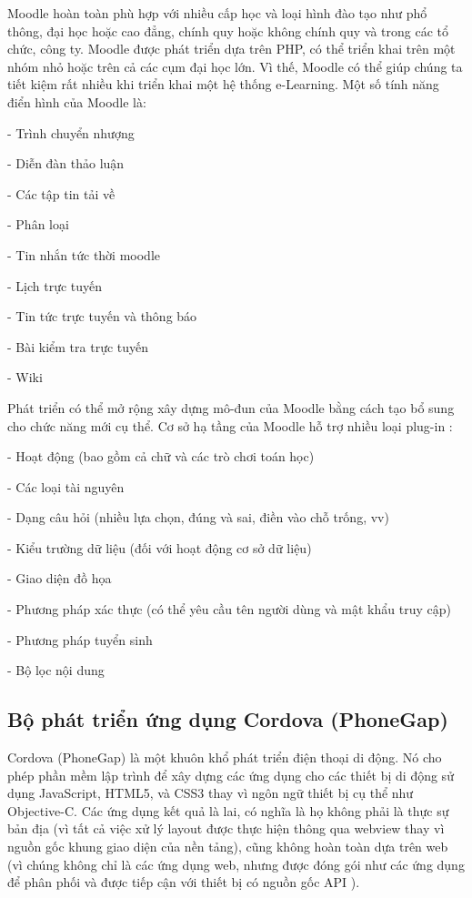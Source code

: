 Moodle hoàn toàn phù hợp với nhiều cấp học và loại hình đào tạo như phổ thông, đại học hoặc cao đẳng, chính quy hoặc không chính quy và trong các tổ chức, công ty.
Moodle được phát triển dựa trên PHP, có thể triển khai trên một nhóm nhỏ hoặc trên cả các cụm đại học lớn. Vì thế, Moodle có thể giúp chúng ta tiết kiệm rất nhiều khi triển khai một hệ thống e-Learning.
Một số tính năng điển hình của Moodle là:

\quad - Trình chuyển nhượng

\quad - Diễn đàn thảo luận

\quad - Các tập tin tải về

\quad - Phân loại

\quad - Tin nhắn tức thời moodle

\quad - Lịch trực tuyến

\quad - Tin tức trực tuyến và thông báo

\quad - Bài kiểm tra trực tuyến

\quad - Wiki

Phát triển có thể mở rộng xây dựng mô-đun của Moodle bằng cách tạo bổ sung cho chức năng mới cụ thể. Cơ sở hạ tầng của Moodle hỗ trợ nhiều loại plug-in :

\quad - Hoạt động (bao gồm cả chữ và các trò chơi toán học)

\quad - Các loại tài nguyên

\quad - Dạng câu hỏi (nhiều lựa chọn, đúng và sai, điền vào chỗ trống, vv)

\quad - Kiểu trường dữ liệu (đối với hoạt động cơ sở dữ liệu)

\quad - Giao diện đồ họa

\quad - Phương pháp xác thực (có thể yêu cầu tên người dùng và mật khẩu truy cập)

\quad - Phương pháp tuyển sinh

\quad - Bộ lọc nội dung

\subsection{Bộ phát triển ứng dụng Cordova (PhoneGap)}

Cordova (PhoneGap) là một khuôn khổ phát triển điện thoại di động. Nó cho phép phần mềm lập trình để xây dựng các ứng dụng cho các thiết bị di động sử dụng JavaScript, HTML5, và CSS3 thay vì ngôn ngữ thiết bị cụ thể như Objective-C. Các ứng dụng kết quả là lai, có nghĩa là họ không phải là thực sự bản địa (vì tất cả việc xử lý layout được thực hiện thông qua webview thay vì nguồn gốc khung giao diện của nền tảng), cũng không hoàn toàn dựa trên web (vì chúng không chỉ là các ứng dụng web, nhưng được đóng gói như các ứng dụng để phân phối và được tiếp cận với thiết bị có nguồn gốc API ).

